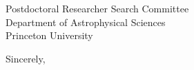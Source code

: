 \documentclass[12pt]{letter}
\begin{document}
\begin{letter}{
               Postdoctoral Researcher Search Committee \\
               Department of Astrophysical Sciences \\
               Princeton University
           }
\closing{Sincerely,}
\vspace{-0.9in}
\\
\end{letter}
\end{document}
